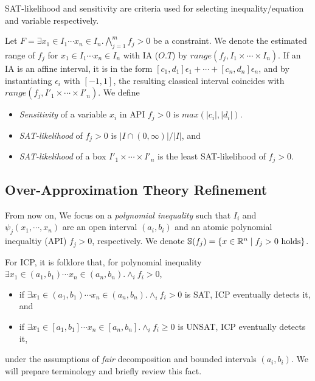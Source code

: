SAT-likelihood and sensitivity are criteria used for selecting inequality/equation and variable respectively.

\begin{definition}
Let $F = \exists x_1 \in I_1 \cdots x_n \in I_n. \bigwedge \limits_{j=1}^m f_j > 0$ be a constraint. 
We denote the estimated range of $f_j$ for $x_1 \in I_1 \cdots x_n \in I_n$ with IA ($O.T$)
by $range(f_j, I_1 \times \cdots \times I_n)$. 
If an IA is an affine interval, 
it is in the form $[c_1,d_1]\epsilon_1 + \cdots + [c_n,d_n]\epsilon_n$, 
and by instantiating $\epsilon_i$ with $[-1,1]$, 
the resulting classical interval coincides with $range(f_j, I'_1 \times \cdots \times I'_n)$. 
We define 
\begin{itemize} 
\item {\em Sensitivity} of a variable $x_i$ in API $f_j > 0$ is $max(|c_i|, |d_i|)$. 
\item {\em SAT-likelihood} of $f_j > 0$ is $| I \cap (0,\infty) | / |I|$, and 
\item {\em SAT-likelihood} of a box $I'_1 \times \cdots \times I'_n$ is 
the least SAT-likelihood of $f_j > 0$. 
\end{itemize} 
\end{definition}

\subsection{Over-Approximation Theory Refinement}
\label{sec:soundness}

From now on, We focus on a \emph{polynomial inequality} such that 
$I_i$ and $\psi_j(x_1,\cdots,x_n)$ are an open interval $(a_i,b_i)$ and 
an atomic polynomial inequaltiy (API) $f_j > 0$, respectively. 
We denote $\mathbb{S}(f_j) = \{x \in {\mathbb R}^n \mid f_j > 0 ~\text{holds}\}$.

For ICP, it is folklore that, for polynomial inequality 
$\exists x_1 \in (a_1,b_1) \cdots x_n \in (a_n,b_n) . \wedge_{i} f_i > 0$, 
\begin{itemize}
\item if $\exists x_1 \in (a_1,b_1) \cdots x_n \in (a_n,b_n) . \wedge_{i} f_i > 0$ is SAT, 
ICP eventually detects it, and 
\item if $\exists x_1 \in [a_1,b_1] \cdots x_n \in [a_n,b_n] . \wedge_{i} f_i \geq 0$ is UNSAT, 
ICP eventually detects it, 
\end{itemize}
under the assumptions of {\em fair} decomposition and bounded intervals $(a_i,b_i)$. 
We will prepare terminology and briefly review this fact. 

